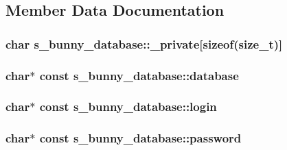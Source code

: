 \subsection{Member Data Documentation}
\hypertarget{structs__bunny__database_adf89f7dc4d038a6d3747c2879e5a1f82}{
\subsubsection[{\-\_\-private}]{ char s\-\_\-bunny\-\_\-database\-::\-\_\-private\mbox{[}sizeof({\bf size\-\_\-t})\mbox{]}}}\label{structs__bunny__database_adf89f7dc4d038a6d3747c2879e5a1f82}
\hypertarget{structs__bunny__database_a10d32b3be7f52966b4835fa27aa04a9c}{
\subsubsection[{database}]{ char$\ast$ {\bf const} s\-\_\-bunny\-\_\-database\-::database}}\label{structs__bunny__database_a10d32b3be7f52966b4835fa27aa04a9c}
\hypertarget{structs__bunny__database_ae394ab01ae57a0d6960d0ca46a7b6384}{
\subsubsection[{login}]{ char$\ast$ {\bf const} s\-\_\-bunny\-\_\-database\-::login}}\label{structs__bunny__database_ae394ab01ae57a0d6960d0ca46a7b6384}
\hypertarget{structs__bunny__database_a9c512819fcc0e39b657183756e5f83f8}{
\subsubsection[{password}]{ char$\ast$ {\bf const} s\-\_\-bunny\-\_\-database\-::password}}\label{structs__bunny__database_a9c512819fcc0e39b657183756e5f83f8}
